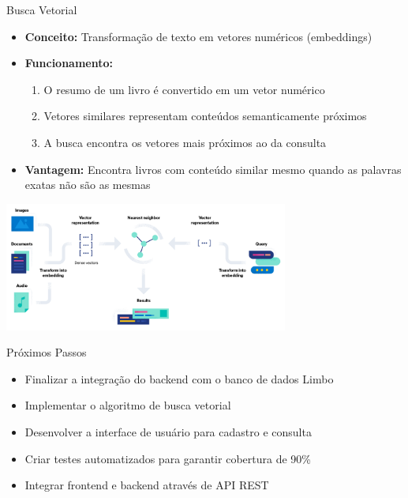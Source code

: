 \documentclass{beamer}
\begin{document}
\begin{frame}{Busca Vetorial}
\begin{itemize}
\item \textbf{Conceito:} Transformação de texto em vetores numéricos
(embeddings)
\item \textbf{Funcionamento:}
\begin{enumerate}
\item O resumo de um livro é convertido em um vetor numérico
\item Vetores similares representam conteúdos semanticamente próximos
\item A busca encontra os vetores mais próximos ao da consulta
\end{enumerate}
\item \textbf{Vantagem:} Encontra livros com conteúdo similar mesmo quando as
palavras exatas não são as mesmas
\end{itemize}
\vspace{0.5cm}
\begin{center}
\includegraphics[width=0.7\textwidth]{vector_search.png}
\end{center}
\end{frame}

\begin{frame}{Próximos Passos}
\begin{itemize}
\item Finalizar a integração do backend com o banco de dados Limbo
\item Implementar o algoritmo de busca vetorial
\item Desenvolver a interface de usuário para cadastro e consulta
\item Criar testes automatizados para garantir cobertura de 90\%
\item Integrar frontend e backend através de API REST
\end{itemize}
\end{frame}
\end{document}
